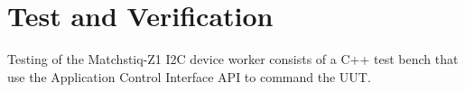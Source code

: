 \documentclass{article}
\begin{document}
\section*{Test and Verification}
Testing of the Matchstiq-Z1 I2C device worker consists of a C++ test bench that use the Application Control Interface API to command the UUT.
\end{document}
